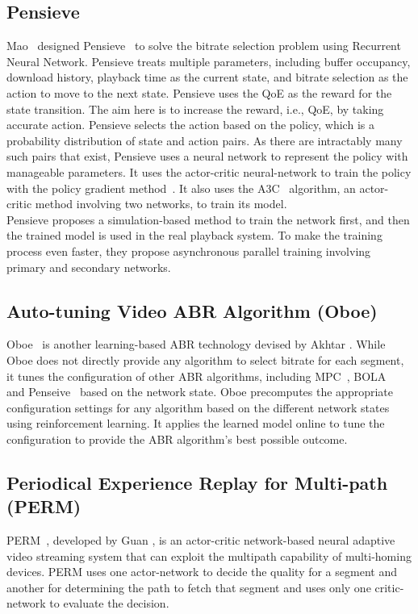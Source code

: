 \subsection{Pensieve}
Mao \etal\ designed Pensieve~\cite{mao2017neural} to solve the bitrate selection problem using Recurrent Neural Network. Pensieve treats multiple parameters, including buffer occupancy, download history, playback time as the current state, and bitrate selection as the action to move to the next state. Pensieve uses the \ac{QoE} as the reward for the state transition. The aim here is to increase the reward, i.e., \ac{QoE}, by taking accurate action. Pensieve selects the action based on the policy, which is a probability distribution of state and action pairs. As there are intractably many such pairs that exist, Pensieve uses a neural network to represent the policy with manageable parameters. It uses the actor-critic neural-network to train the policy with the policy gradient method~\cite{sutton1999policy}. It also uses the \ac{A3C}~\cite{10.5555/3045390.3045594} algorithm, an actor-critic method involving two networks, to train its model.\\
Pensieve proposes a simulation-based method to train the network first, and then the trained model is used in the real playback system. To make the training process even faster, they propose asynchronous parallel training involving primary and secondary networks.

\subsection{Auto-tuning Video ABR Algorithm (Oboe)}
Oboe~\cite{Akhtar2018} is another learning-based ABR technology devised by Akhtar \etal. While Oboe does not directly provide any algorithm to select bitrate for each segment, it tunes the configuration of other \ac{ABR} algorithms, including MPC~\cite{yin2015control,10.1145/2670518.2673877}, BOLA~\cite{Spiteri2016} and Penseive~\cite{mao2017neural} based on the network state. Oboe precomputes the appropriate configuration settings for any algorithm based on the different network states using reinforcement learning. It applies the learned model online to tune the configuration to provide the \ac{ABR} algorithm's best possible outcome.


\subsection{Periodical Experience Replay for Multi-path (PERM)}
PERM~\cite{9155492}, developed by Guan \etal, is an actor-critic network-based neural adaptive video streaming system that can exploit the multipath capability of multi-homing devices. PERM uses one actor-network to decide the quality for a segment and another for determining the path to fetch that segment and uses only one critic-network to evaluate the decision.

